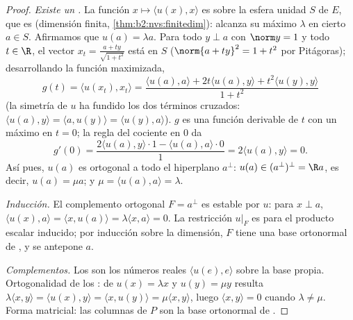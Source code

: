 \begin{proof}
\emph{Existe un .} La función $x \mapsto \langle u(x),
x\rangle$ es  sobre la esfera unidad $S$ de $E$, que es
 (dimensión finita, \cref{thm:b2:nvs:finitedim}): alcanza su
máximo $\lambda$ en cierto $a \in S$. Afirmamos que $u(a) = \lambda
a$. Para todo $y \perp a$ con $\norm y = 1$ y todo $t \in \R$, el
vector $x_t = \frac{a + ty}{\sqrt{1 + t^2}}$ está en $S$ ($\norm{a +
ty}^2 = 1 + t^2$ por Pitágoras); desarrollando la función
maximizada,
\[
g(t) = \langle u(x_t), x_t\rangle
= \frac{\langle u(a), a\rangle + 2t\langle u(a), y\rangle +
t^2\langle u(y), y\rangle}{1 + t^2}
\]
(la simetría de $u$ ha fundido los dos términos cruzados: $\langle
u(a), y\rangle = \langle a, u(y)\rangle = \langle u(y), a\rangle$).
$g$ es una función derivable de $t$ con un máximo en $t = 0$; la
regla del cociente en $0$ da
\[
g'(0) = \frac{2\langle u(a), y\rangle\cdot 1 - \langle u(a),
a\rangle\cdot 0}{1} = 2\langle u(a), y\rangle = 0 .
\]
Así pues, $u(a)$ es ortogonal a todo el hiperplano $a^\perp$: $u(a)
\in (a^{\perp})^{\perp} = \R a$, es decir, $u(a) = \mu a$; y $\mu =
\langle u(a), a\rangle = \lambda$.

\emph{Inducción.} El complemento ortogonal $F = a^\perp$ es estable
por $u$: para $x \perp a$, $\langle u(x), a\rangle = \langle x,
u(a)\rangle = \lambda\langle x, a\rangle = 0$. La restricción $u|_F$
es  para el producto escalar inducido; por inducción
sobre la dimensión, $F$ tiene una base ortonormal de , y se antepone $a$.

\emph{Complementos.} Los  son los números reales
$\langle u(e), e\rangle$ sobre la base propia. Ortogonalidad de los
: de $u(x) = \lambda x$ y $u(y) = \mu y$ resulta
$\lambda\langle x, y\rangle = \langle u(x), y\rangle = \langle x,
u(y)\rangle = \mu\langle x, y\rangle$, luego $\langle x, y\rangle =
0$ cuando $\lambda \neq \mu$. Forma matricial: las columnas de $P$
son la base ortonormal de .
\end{proof}

